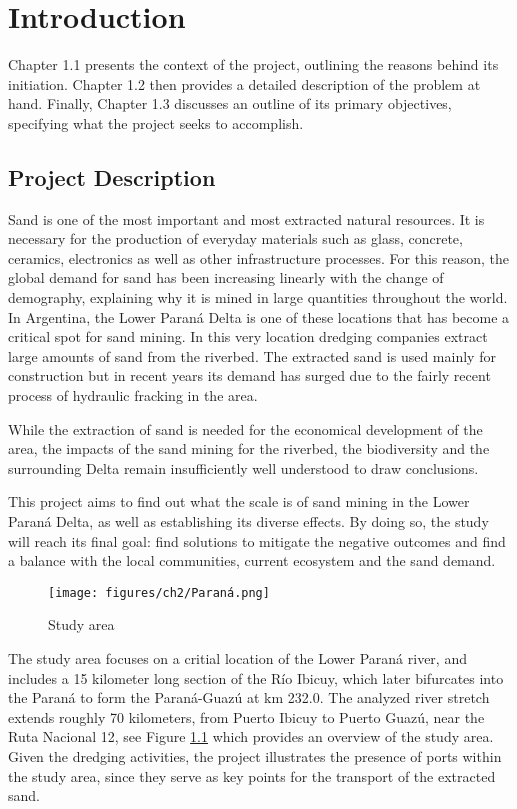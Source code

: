 \chapter{Introduction}
\label{chapter:introduction}

Chapter 1.1 presents the context of the project, outlining the reasons behind its initiation. Chapter 1.2 then provides a detailed description of the problem at hand. Finally, Chapter 1.3 discusses an outline of its primary objectives, specifying what the project seeks to accomplish.

\section{Project Description}

Sand is one of the most important and most extracted natural resources. It is necessary for the production of everyday materials such as glass, concrete, ceramics, electronics as well as other infrastructure processes. For this reason, the global demand for sand has been increasing linearly with the change of demography, explaining why it is mined in large quantities throughout the world. 
In Argentina, the Lower Paraná Delta is one of these locations that has become a critical spot for sand mining. In this very location dredging companies extract large amounts of sand from the riverbed. The extracted sand is used mainly for construction but in recent years its demand has surged due to the fairly recent process of hydraulic fracking in the area.

While the extraction of sand is needed for the economical development of the area, the impacts of the sand mining for the riverbed, the biodiversity and the surrounding Delta remain insufficiently well understood to draw conclusions. 

This project aims to find out what the scale is of sand mining in the Lower Paraná Delta, as well as establishing its diverse effects. By doing so, the study will reach its final goal: find solutions to mitigate the negative outcomes and find a balance with the local communities, current ecosystem and the sand demand. 



\begin{figure}[H]
    \centering    \texttt{[image: figures/ch2/Paraná.png]}
    \caption{Study area}
    \label{fig:study area}
\end{figure}
\label{Figure 1.1}

The study area focuses on a critial location of the Lower Paraná river, and includes a 15 kilometer long section of the Río Ibicuy, which later bifurcates into the Paraná to form the Paraná-Guazú at km 232.0. The analyzed river stretch extends roughly 70 kilometers, from Puerto Ibicuy to Puerto Guazú, near the Ruta Nacional 12, see Figure \ref{fig:study area} which provides an overview of the study area. Given the dredging activities, the project illustrates the presence of ports within the study area, since they serve as key points for the transport of the extracted sand.




